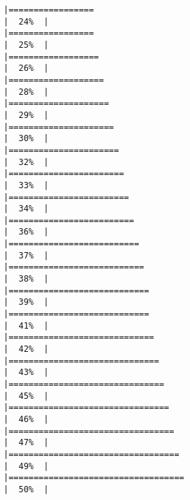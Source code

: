 \documentclass[
]{article}
\begin{document}
\begin{verbatim}
|=================                                                     |  24%  |                                                                              |=================                                                     |  25%  |                                                                              |==================                                                    |  26%  |                                                                              |===================                                                   |  28%  |                                                                              |====================                                                  |  29%  |                                                                              |=====================                                                 |  30%  |                                                                              |======================                                                |  32%  |                                                                              |=======================                                               |  33%  |                                                                              |========================                                              |  34%  |                                                                              |=========================                                             |  36%  |                                                                              |==========================                                            |  37%  |                                                                              |===========================                                           |  38%  |                                                                              |============================                                          |  39%  |                                                                              |============================                                          |  41%  |                                                                              |=============================                                         |  42%  |                                                                              |==============================                                        |  43%  |                                                                              |===============================                                       |  45%  |                                                                              |================================                                      |  46%  |                                                                              |=================================                                     |  47%  |                                                                              |==================================                                    |  49%  |                                                                              |===================================                                   |  50%  |                                                                              
\end{verbatim}
\end{document}
